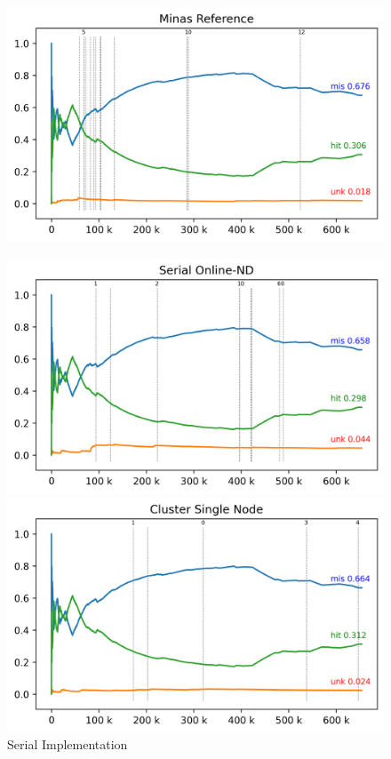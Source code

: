 \begin{figure}[htb]
  \centering
  \begin{minipage}{0.48\textwidth}
    \centering
    \includegraphics[width=1\linewidth]{experiments/revised-java-log.png}
    \label{fig:validation-sub-java}
  \end{minipage}
  \hfill
  \begin{minipage}{0.48\textwidth}
    \centering
    \includegraphics[width=1\linewidth]{experiments/online-nd-log.png}
    \caption{Serial Implementation}
    \label{fig:validation-sub-serial}
  \end{minipage}
  \vspace{5mm}
  \begin{minipage}{0.48\textwidth}
    \centering
    \includegraphics[width=1\linewidth]{experiments/tmi-base-log.png}

\end{minipage}
\end{figure}
